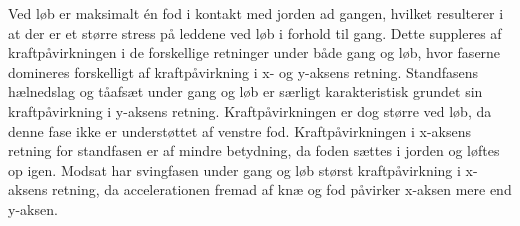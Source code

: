 Ved løb er maksimalt én fod i kontakt med jorden ad gangen, hvilket resulterer i at der er et større stress på leddene ved løb i forhold til gang. \citep{Adelaar1986} Dette suppleres af kraftpåvirkningen i de forskellige retninger under både gang og løb, hvor faserne domineres forskelligt af kraftpåvirkning i x- og y-aksens retning. \newline 
Standfasens hælnedslag og tåafsæt under gang og løb  er særligt karakteristisk grundet sin kraftpåvirkning i y-aksens retning. Kraftpåvirkningen er dog større ved løb, da denne fase ikke er understøttet af venstre fod. Kraftpåvirkningen i x-aksens retning for standfasen er af mindre betydning, da foden sættes i jorden og løftes op igen. Modsat har svingfasen under gang og løb størst kraftpåvirkning i x-aksens retning, da accelerationen fremad af knæ og fod påvirker x-aksen mere end y-aksen. \citep{Rueterbories2010} 

